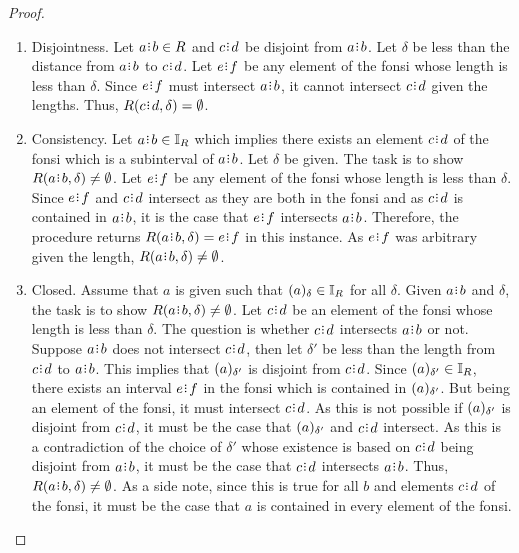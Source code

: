 \documentclass[12pt]{article}
\begin{document}
\begin{proof}
\begin{enumerate}
        \item Disjointness. Let $a\rint b \in R$ and $c\rint d$ be disjoint from $a\rint b$. Let $\delta$ be less than the distance from $a\rint b$ to $c\rint d$. Let $e\rint f$ be any element of the fonsi whose length is less than $\delta$. Since $e\rint f$ must intersect $a\rint b$, it cannot intersect $c\rint d$ given the lengths. Thus, $R(c\rint d, \delta) = \emptyset$. 
    
        \item Consistency. Let $a\rint b \in \mathbb{I}_R$ which implies there exists an element $c\rint d$ of the fonsi which is a subinterval of $a\rint b$. Let  $ \delta$ be given. The task is to show $R(a\rint b, \delta) \neq \emptyset$. Let $e\rint f$ be any element of the fonsi whose length is less than $\delta$. Since $e\rint f$ and $c\rint d$ intersect as they are both in the fonsi and as $c\rint d$ is contained in $a\rint b$, it is the case that $e\rint f$ intersects $a\rint b$. Therefore, the procedure returns $R(a\rint b, \delta) = e\rint f$ in this instance. As $e\rint f$ was arbitrary given the length, $R(a\rint b, \delta) \neq \emptyset$. 
        
        \item Closed. Assume that $a$ is given such that $\halo{a} \in \mathbb{I}_R$ for all $\delta$. Given $a\rint b$ and $\delta$, the task is to show $R(a\rint b, \delta) \neq \emptyset$. Let $c\rint d$ be an element of the fonsi whose length is less than $\delta$. The question is whether $c\rint d$ intersects $a\rint b$ or not. Suppose $a\rint b$ does not intersect $c\rint d$, then let $\delta'$  be less than the length from $c\rint d$ to $a\rint b$. This implies that $\halo[\delta']{a}$ is disjoint from $c\rint d$. Since $\halo[\delta']{a} \in \mathbb{I}_R$, there exists an interval $e\rint f$ in the fonsi which is contained in $\halo[\delta']{a}$. But being an element of the fonsi, it must intersect $c\rint d$. As this is not possible if $\halo[\delta']{a}$ is disjoint from $c\rint d$, it must be the case that $\halo[\delta']{a}$ and $c\rint d$ intersect. As this is a contradiction of the choice of $\delta'$ whose existence is based on $c\rint d$ being disjoint from $a\rint b$, it must be the case that $c\rint d$ intersects $a\rint b$. Thus, $R(a\rint b, \delta) \neq \emptyset$. As a side note, since this is true for all $b$ and elements $c\rint d$ of the fonsi, it must be the case that $a$ is contained in every element of the fonsi. 
    \end{enumerate}

\end{proof}
\end{document}
